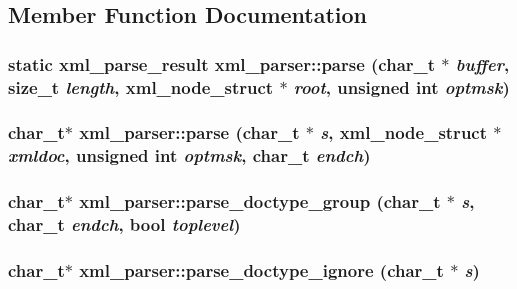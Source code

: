 \subsection{Member Function Documentation}
\hypertarget{structxml__parser_a116885dc8aaf5fcd025511def4605674}{
\subsubsection[{parse}]{\setlength{\rightskip}{0pt plus 5cm}static xml\_\-parse\_\-result xml\_\-parser::parse (char\_\-t $\ast$ {\em buffer}, \/  size\_\-t {\em length}, \/  xml\_\-node\_\-struct $\ast$ {\em root}, \/  unsigned int {\em optmsk})}}
\label{structxml__parser_a116885dc8aaf5fcd025511def4605674}
\hypertarget{structxml__parser_a00626800a3d535c14273c48238c03a70}{
\subsubsection[{parse}]{\setlength{\rightskip}{0pt plus 5cm}char\_\-t$\ast$ xml\_\-parser::parse (char\_\-t $\ast$ {\em s}, \/  xml\_\-node\_\-struct $\ast$ {\em xmldoc}, \/  unsigned int {\em optmsk}, \/  char\_\-t {\em endch})}}
\label{structxml__parser_a00626800a3d535c14273c48238c03a70}
\hypertarget{structxml__parser_a9bc0e5f3d75cd7edb267a85430e1cdfc}{
\subsubsection[{parse\_\-doctype\_\-group}]{\setlength{\rightskip}{0pt plus 5cm}char\_\-t$\ast$ xml\_\-parser::parse\_\-doctype\_\-group (char\_\-t $\ast$ {\em s}, \/  char\_\-t {\em endch}, \/  bool {\em toplevel})}}
\label{structxml__parser_a9bc0e5f3d75cd7edb267a85430e1cdfc}
\hypertarget{structxml__parser_a1e996ac9c9993f1939128859596376a1}{
\subsubsection[{parse\_\-doctype\_\-ignore}]{\setlength{\rightskip}{0pt plus 5cm}char\_\-t$\ast$ xml\_\-parser::parse\_\-doctype\_\-ignore (char\_\-t $\ast$ {\em s})}}
